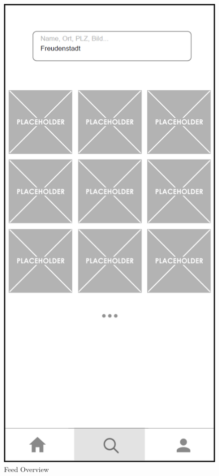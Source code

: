 \begin{figure}[H]
    \centering
    \begin{minipage}{.5\textwidth}
        \centering
        \includegraphics[width=.6\linewidth]{images/Feed_Overview_MockUp.png}
        \caption{Feed Overview}
        \label{fig:feed_overview}
    \end{minipage}%
    \begin{minipage}{.5\textwidth}
      \centering

\end{minipage}
\end{figure}
